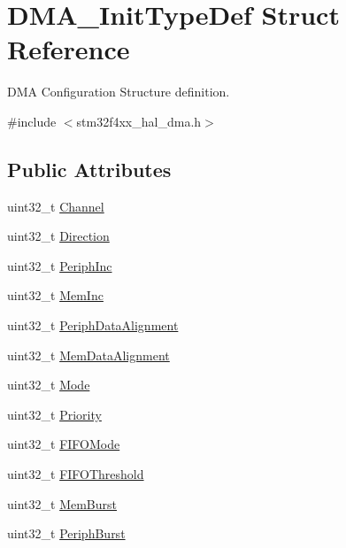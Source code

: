\hypertarget{struct_d_m_a___init_type_def}{}\section{D\+M\+A\+\_\+\+Init\+Type\+Def Struct Reference}
\label{struct_d_m_a___init_type_def}


D\+MA Configuration Structure definition.  




{\ttfamily \#include $<$stm32f4xx\+\_\+hal\+\_\+dma.\+h$>$}

\subsection*{Public Attributes}
\begin{DoxyCompactItemize}
\item 
uint32\+\_\+t \hyperlink{struct_d_m_a___init_type_def_af62608eb25864208cae5d59acef282a6}{Channel}
\item 
uint32\+\_\+t \hyperlink{struct_d_m_a___init_type_def_a0145b5d0e074fa8e2e185ecf2c4a15ca}{Direction}
\item 
uint32\+\_\+t \hyperlink{struct_d_m_a___init_type_def_a46811eb656170cb5c542054d1a41db3a}{Periph\+Inc}
\item 
uint32\+\_\+t \hyperlink{struct_d_m_a___init_type_def_a49b187ba5ab8ba4354e02837e8b99414}{Mem\+Inc}
\item 
uint32\+\_\+t \hyperlink{struct_d_m_a___init_type_def_a10a4a549953efa20c235dcbb381b6f0b}{Periph\+Data\+Alignment}
\item 
uint32\+\_\+t \hyperlink{struct_d_m_a___init_type_def_a7784efedc4a61325fa7364fcace10136}{Mem\+Data\+Alignment}
\item 
uint32\+\_\+t \hyperlink{struct_d_m_a___init_type_def_adbbca090b53d32ac93cc7359b7994db2}{Mode}
\item 
uint32\+\_\+t \hyperlink{struct_d_m_a___init_type_def_af110cc02c840207930e3c0e5de5d7dc4}{Priority}
\item 
uint32\+\_\+t \hyperlink{struct_d_m_a___init_type_def_acda0396cf55baab166f51b1ea1deed0d}{F\+I\+F\+O\+Mode}
\item 
uint32\+\_\+t \hyperlink{struct_d_m_a___init_type_def_a2f994cc2979b82cd215e9f38edbbc6ed}{F\+I\+F\+O\+Threshold}
\item 
uint32\+\_\+t \hyperlink{struct_d_m_a___init_type_def_ad5e266a0b90f58365e21c349654bc68d}{Mem\+Burst}
\item 
uint32\+\_\+t \hyperlink{struct_d_m_a___init_type_def_a3fbfe4dd664e24845dc75f5c8f43b5a3}{Periph\+Burst}
\end{DoxyCompactItemize}


